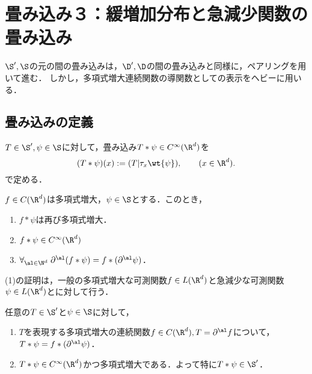 \documentclass[uplatex,dvipdfmx]{jsreport}
\begin{document}
\section{畳み込み３：緩増加分布と急減少関数の畳み込み}

\begin{tcolorbox}[colframe=ForestGreen, colback=ForestGreen!10!white,breakable,colbacktitle=ForestGreen!40!white,coltitle=black,fonttitle=\bfseries\sffamily,
title=]
    $\S',\S$の元の間の畳み込みは，$\D',\D$の間の畳み込みと同様に，ペアリングを用いて進む．
    しかし，多項式増大連続関数の導関数としての表示をヘビーに用いる．
\end{tcolorbox}

\subsection{畳み込みの定義}

\begin{definition}
    $T\in\S',\psi\in\S$に対して，畳み込み$T*\psi\in C^\infty(\R^d)$を
    \[(T*\psi)(x):=(T|\tau_x\wt{\psi}),\qquad(x\in\R^d).\]
    で定める．
\end{definition}

\begin{lemma}
    $f\in C(\R^d)$は多項式増大，$\psi\in\S$とする．このとき，
    \begin{enumerate}
        \item $f*\psi$は再び多項式増大．
        \item $f*\psi\in C^\infty(\R^d)$
        \item $\forall_{\al\in\N^d}\;\partial^\al(f*\psi)=f*(\partial^\al\psi)$．
    \end{enumerate}
    (1)の証明は，一般の多項式増大な可測関数$f\in L(\R^d)$と急減少な可測関数$\psi\in L(\R^d)$とに対して行う．
\end{lemma}

\begin{proposition}
    任意の$T\in\S'$と$\psi\in\S$に対して，
    \begin{enumerate}
        \item $T$を表現する多項式増大の連続関数$f\in C(\R^d),T=\partial^\al f$について，$T*\psi=f*(\partial^\al\psi)$．
        \item $T*\psi\in C^\infty(\R^d)$かつ多項式増大である．よって特に$T*\psi\in\S'$．
    \end{enumerate}
\end{proposition}
\end{document}
